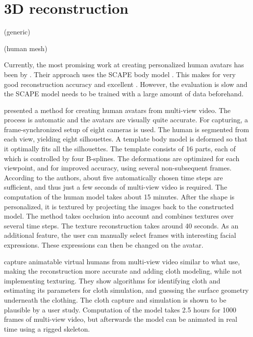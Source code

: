 \section{3D reconstruction}
(generic)
\citep{fabio2003point}

(human mesh)

Currently, the most promising work at creating personalized human avatars has been by \citet{weiss2011home}. Their approach uses the SCAPE body model \citep{anguelov2005scape}. This makes for very good reconstruction accuracy and excellent . However, the evaluation is slow and the SCAPE model needs to be trained with a large amount of data beforehand.

\citep{schneider2010fitting}

\citet{ahmed2005automatic} presented a method for creating human avatars from multi-view video. The process is automatic and the avatars are visually quite accurate. For capturing, a frame-synchronized setup of eight cameras is used. The human is segmented from each view, yielding eight silhouettes. A template body model is deformed so that it optimally fits all the silhouettes. The template consists of 16 parts, each of which is controlled by four B-splines. The deformations are optimized for each viewpoint, and for improved accuracy, using several non-subsequent frames. According to the authors, about five automatically chosen time steps are sufficient, and thus just a few seconds of multi-view video is required. The computation of the human model takes about 15 minutes. After the shape is personalized, it is textured by projecting the images back to the constructed model. The method takes occlusion into account and combines textures over several time steps. The texture reconstruction takes around 40 seconds. As an additional feature, the user can manually select frames with interesting facial expressions. These expressions can then be changed on the avatar. \citep{ahmed2005automatic}

\citet{stoll2010video} capture animatable virtual humans from multi-view video similar to what \citet{ahmed2005automatic} use, making the reconstruction more accurate and adding cloth modeling, while not implementing texturing. They show algorithms for identifying cloth and estimating its parameters for cloth simulation, and guessing the surface geometry underneath the clothing. The cloth capture and simulation is shown to be plausible by a user study. Computation of the model takes 2.5 hours for 1000 frames of multi-view video, but afterwards the model can be animated in real time using a rigged skeleton. \citep{stoll2010video}

